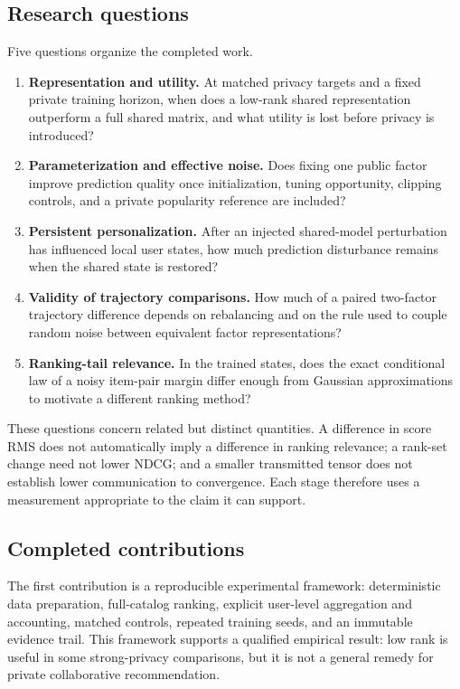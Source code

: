 \subsection{Research questions}
Five questions organize the completed work.
\begin{enumerate}[label=RQ\arabic*.]
\item \textbf{Representation and utility.} At matched privacy targets and a fixed
private training horizon, when does a low-rank shared representation outperform
a full shared matrix, and what utility is lost before privacy is introduced?
\item \textbf{Parameterization and effective noise.} Does fixing one public
factor improve prediction quality once initialization, tuning opportunity,
clipping controls, and a private popularity reference are included?
\item \textbf{Persistent personalization.} After an injected shared-model
perturbation has influenced local user states, how much prediction disturbance
remains when the shared state is restored?
\item \textbf{Validity of trajectory comparisons.} How much of a paired
two-factor trajectory difference depends on rebalancing and on the rule used to
couple random noise between equivalent factor representations?
\item \textbf{Ranking-tail relevance.} In the trained states, does the exact
conditional law of a noisy item-pair margin differ enough from Gaussian
approximations to motivate a different ranking method?
\end{enumerate}
These questions concern related but distinct quantities. A difference in score
RMS does not automatically imply a difference in ranking relevance; a rank-set
change need not lower NDCG; and a smaller transmitted tensor does not establish
lower communication to convergence. Each stage therefore uses a measurement
appropriate to the claim it can support.

\subsection{Completed contributions}
The first contribution is a reproducible experimental framework: deterministic
data preparation, full-catalog ranking, explicit user-level aggregation and
accounting, matched controls, repeated training seeds, and an immutable evidence
trail. This framework supports a qualified empirical result: low rank is useful
in some strong-privacy comparisons, but it is not a general remedy for private
collaborative recommendation.

